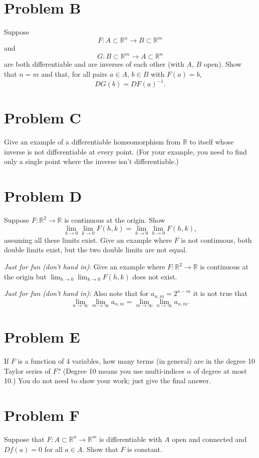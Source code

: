 \documentclass[lang=cn,11pt]{template}
\begin{document}
\section*{Problem B}
Suppose
\[
F : A \subset \mathbb{R}^n \to B \subset \mathbb{R}^m
\]
and
\[
G : B \subset \mathbb{R}^m \to A \subset \mathbb{R}^n
\]
are both differentiable and are inverses of each other (with $A$, $B$ open). Show that $n = m$ and that, for all pairs $a \in A$, $b \in B$ with $F(a) = b$,
\[
DG(b) = DF(a)^{-1}.
\]

\section*{Problem C}
Give an example of a differentiable homeomorphism from $\mathbb{R}$ to itself whose inverse is not differentiable at every point. (For your example, you need to find only a single point where the inverse isn’t differentiable.)

\section*{Problem D}
Suppose $F : \mathbb{R}^2 \to \mathbb{R}$ is continuous at the origin. Show
\[
\lim_{h \to 0} \lim_{k \to 0} F(h, k) = \lim_{k \to 0} \lim_{h \to 0} F(h, k),
\]
assuming all these limits exist. Give an example where $F$ is not continuous, both double limits exist, but the two double limits are not equal.

\textit{Just for fun (don’t hand in)}: Give an example where $F : \mathbb{R}^2 \to \mathbb{R}$ is continuous at the origin but $\lim_{h \to 0} \lim_{k \to 0} F(h, k)$ does not exist.

\textit{Just for fun (don’t hand in)}: Also note that for $a_{n,m} = 2^{n-m}$ it is not true that
\[
\lim_{n \to \infty} \lim_{m \to \infty} a_{n,m} = \lim_{m \to \infty} \lim_{n \to \infty} a_{n,m}.
\]

\section*{Problem E}
If $F$ is a function of 4 variables, how many terms (in general) are in the degree 10 Taylor series of $F$? (Degree 10 means you use multi-indices $\alpha$ of degree at most 10.) You do not need to show your work; just give the final answer.

\section*{Problem F}
Suppose that $F : A \subset \mathbb{R}^n \to \mathbb{R}^m$ is differentiable with $A$ open and connected and $Df(a) = 0$ for all $a \in A$. Show that $F$ is constant.
\end{document}
